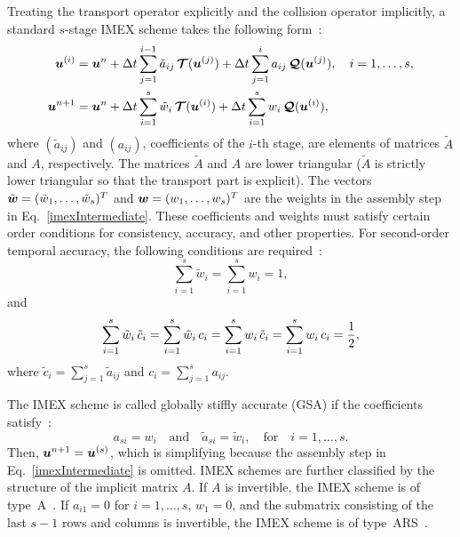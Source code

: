 Treating the transport operator explicitly and the collision operator implicitly, a standard $s$-stage IMEX scheme takes the following form~\cite{pareschiRusso_2005}: 
\begin{align}
  \boldsymbol{u}^{(i)}
  &=\boldsymbol{u}^{n}
  +\Delta t\sum_{j=1}^{i-1}\tilde{a}_{ij}\,\boldsymbol{\mathcal{T}}(\boldsymbol{u}^{(j)})
  +\Delta t\sum_{j=1}^{i}a_{ij}\,\boldsymbol{\mathcal{Q}}(\boldsymbol{u}^{(j)}),
  \quad i=1,\ldots,s, \label{imexStages} \\
  \boldsymbol{u}^{n+1}
  &=\boldsymbol{u}^{n}
  +\Delta t\sum_{i=1}^{s}\tilde{w}_{i}\,\boldsymbol{\mathcal{T}}(\boldsymbol{u}^{(i)})
  +\Delta t\sum_{i=1}^{s}w_{i}\,\boldsymbol{\mathcal{Q}}(\boldsymbol{u}^{(i)}), \label{imexIntermediate} 
\end{align}
where $(\tilde{a}_{ij})$ and $(a_{ij})$, coefficients of the $i$-th stage, are elements of matrices $\tilde{A}$ and $A$, respectively.
The matrices $\tilde{A}$ and $A$ are lower triangular ($\tilde{A}$ is strictly lower triangular so that the transport part is explicit).  
The vectors $\tilde{\boldsymbol{w}}=(\tilde{w}_{1},\ldots,\tilde{w}_{s})^{T}$ and $\boldsymbol{w}=(w_{1},\ldots,w_{s})^{T}$ are the weights in the assembly step in Eq.~\eqref{imexIntermediate}.
These coefficients and weights must satisfy certain order conditions for consistency, accuracy, and other properties.  
For second-order temporal accuracy, the following conditions are required~\cite{hairer_1981}:
\begin{equation}
  \sum_{i=1}^{s}\tilde{w}_{i}=\sum_{i=1}^{s}w_{i}=1,
  \label{orderConditions1}
\end{equation}
and
\begin{equation}
  \sum_{i=1}^{s}\tilde{w}_{i}\,\tilde{c}_{i}
  =\sum_{i=1}^{s}\tilde{w}_{i}\,c_{i}
  =\sum_{i=1}^{s}w_{i}\,\tilde{c}_{i}
  =\sum_{i=1}^{s}w_{i}\,c_{i}=\frac{1}{2}, 
  \label{orderConditions2}
\end{equation}
where $\tilde{c}_{i} = \sum_{j=1}^{s}\tilde{a}_{ij}$ and $c_{i}=\sum_{j=1}^{s}a_{ij}$.

The IMEX scheme is called globally stiffly accurate (GSA) if the coefficients satisfy~\cite{dimarcoPareschi2013}:
\begin{equation}
  a_{si}=w_{i} \quad\text{and}\quad \tilde{a}_{si}=\tilde{w}_{i}, \quad \text{for} \quad i=1,\ldots,s.
\end{equation}
Then, $\boldsymbol{u}^{n+1} = \boldsymbol{u}^{(s)}$, which is simplifying because the assembly step in Eq.~\eqref{imexIntermediate} is omitted.  
IMEX schemes are further classified by the structure of the implicit matrix $A$.  
If $A$ is invertible, the IMEX scheme is of type~A~\cite{pareschiRusso_2005}.  
If $a_{i1} = 0$ for $i=1,\ldots,s$, $w_{1} = 0$, and the submatrix consisting of the last $s-1$ rows and columns is invertible, the IMEX scheme is of type~ARS~\cite{ascher_etal_1997,pareschiRusso_2005}.  

